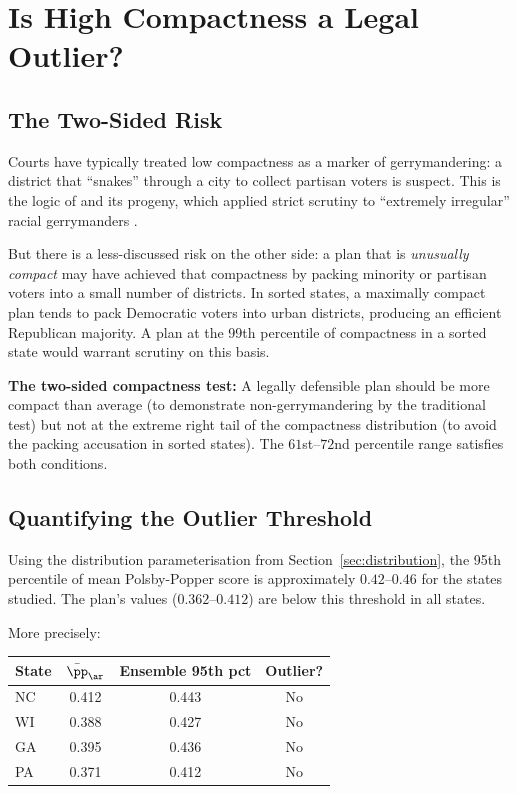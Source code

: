 \section{Is High Compactness a Legal Outlier?}
\label{sec:outlier}

\subsection{The Two-Sided Risk}

Courts have typically treated low compactness as a marker of gerrymandering:
a district that ``snakes'' through a city to collect partisan voters is suspect.
This is the logic of \shaw{} and its progeny, which applied strict scrutiny to
``extremely irregular'' racial gerrymanders \citep{scotus1993shaw}.

But there is a less-discussed risk on the other side: a plan that is
\emph{unusually compact} may have achieved that compactness by packing
minority or partisan voters into a small number of districts.  In sorted
states, a maximally compact plan tends to pack Democratic voters into
urban districts, producing an efficient Republican majority.  A plan at the
99th percentile of compactness in a sorted state would warrant scrutiny on
this basis.

\begin{keybox}
\textbf{The two-sided compactness test:} A legally defensible plan should
be more compact than average (to demonstrate non-gerrymandering by the
traditional test) but not at the extreme right tail of the compactness
distribution (to avoid the packing accusation in sorted states).
The $61$st--$72$nd percentile range satisfies both conditions.
\end{keybox}

\subsection{Quantifying the Outlier Threshold}

Using the distribution parameterisation from Section~\ref{sec:distribution},
the 95th percentile of mean Polsby-Popper score is approximately
$0.42$--$0.46$ for the states studied.  The \ar{} plan's values
($0.362$--$0.412$) are below this threshold in all states.

More precisely:

\begin{center}
\begin{tabular}{lccc}
\toprule
State & $\bar\pp_{\ar}$ & Ensemble 95th pct & Outlier? \\
\midrule
NC & 0.412 & 0.443 & No \\
WI & 0.388 & 0.427 & No \\
GA & 0.395 & 0.436 & No \\
PA & 0.371 & 0.412 & No \\
\bottomrule
\end{tabular}
\end{center}

